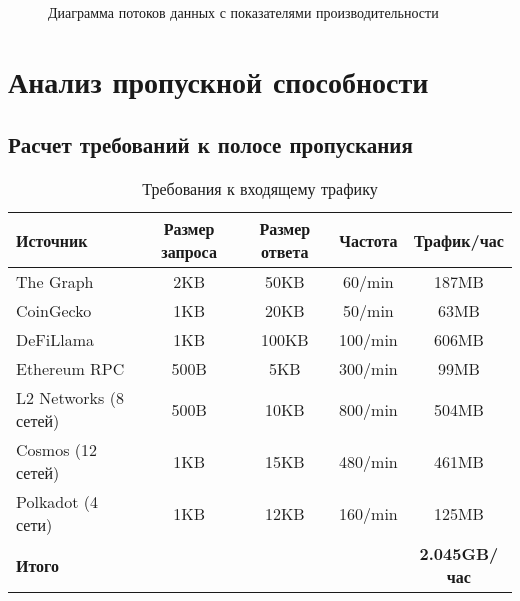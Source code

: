 \documentclass[11pt,a4paper]{article}
\begin{document}
\begin{figure}[H]
\caption{Диаграмма потоков данных с показателями производительности}
\label{fig:data-performance-diagram}
\end{figure}

\section{Анализ пропускной способности}

\subsection{Расчет требований к полосе пропускания}

\begin{table}[H]
\centering
\small
\begin{tabular}{|l|c|c|c|c|}
\hline
\textbf{Источник} & \textbf{Размер запроса} & \textbf{Размер ответа} & \textbf{Частота} & \textbf{Трафик/час} \\
\hline
The Graph & 2KB & 50KB & 60/min & 187MB \\
CoinGecko & 1KB & 20KB & 50/min & 63MB \\
DeFiLlama & 1KB & 100KB & 100/min & 606MB \\
Ethereum RPC & 500B & 5KB & 300/min & 99MB \\
L2 Networks (8 сетей) & 500B & 10KB & 800/min & 504MB \\
Cosmos (12 сетей) & 1KB & 15KB & 480/min & 461MB \\
Polkadot (4 сети) & 1KB & 12KB & 160/min & 125MB \\
\hline
\textbf{Итого} & & & & \textbf{2.045GB/час} \\
\hline
\end{tabular}
\caption{Требования к входящему трафику}
\end{table}
\end{document}

